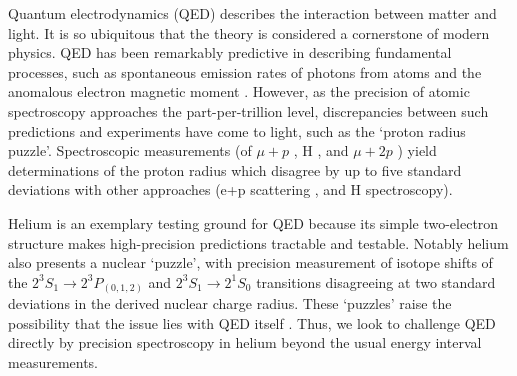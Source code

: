 \documentclass[aps,prl,
reprint,
superscriptaddress,
 amsmath,amssymb,
floatfix
]{revtex4-2}
\newcommand{\MetastableState}{2^{3\!}S_1}%
\newcommand{\UpperStateManifold}{3^{3\!}P}%
\newcommand{\LowerStates}{2^{3\!}P_{(0,1,2)}}%
\newcommand{\LowerStateManifold}{2^{3\!}P}%
\newcommand{\SingletState}{2^{1\!}S_0}%
\begin{document}

\maketitle

Quantum electrodynamics (QED) describes the interaction between matter and light. It is so ubiquitous that the theory is considered a cornerstone of modern physics.
QED has been remarkably predictive in describing fundamental processes, such as spontaneous emission rates of photons from atoms and the anomalous electron magnetic moment \cite{PhysRevD.91.033006}.
However, as the precision of atomic spectroscopy approaches the part-per-trillion level, discrepancies between such predictions and experiments have come to light, such as the `proton radius puzzle'. Spectroscopic measurements (of $\mu+p$ \cite{Pohl2010}, H \cite{Bezginov1007,Beyer79}, and $\mu +2p$ \cite{Pohl669}) yield determinations of the proton radius which disagree by up to five standard deviations with other approaches (e+p scattering \cite{ZHAN201159}, and H spectroscopy\cite{PhysRevLett.120.183001}). 


Helium is an exemplary testing ground for QED because its simple two-electron structure makes high-precision predictions tractable and testable. Notably helium also presents a nuclear `puzzle', with precision measurement of isotope shifts of the \(\MetastableState \rightarrow \LowerStates \) \cite{PhysRevLett.119.263002} and \(\MetastableState \rightarrow \SingletState \) \cite{Rengelink2018} transitions disagreeing at two standard deviations in the derived nuclear charge radius. These `puzzles' raise the possibility that the issue lies with QED itself \cite{refId0}. Thus, we look to challenge QED directly by precision spectroscopy in helium beyond the usual energy interval measurements.
\end{document}
